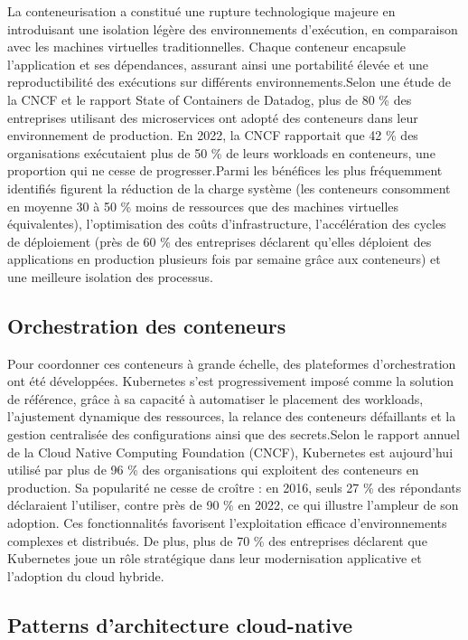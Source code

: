 La conteneurisation a constitué une rupture technologique majeure en introduisant une isolation légère des environnements d’exécution, en comparaison avec les machines virtuelles traditionnelles. Chaque conteneur encapsule l’application et ses dépendances, assurant ainsi une portabilité élevée et une reproductibilité des exécutions sur différents environnements.Selon une étude de la CNCF et le rapport State of Containers de Datadog, plus de 80 \% des entreprises utilisant des microservices ont adopté des conteneurs dans leur environnement de production. En 2022, la CNCF rapportait que 42 \% des organisations exécutaient plus de 50 \% de leurs workloads en conteneurs, une proportion qui ne cesse de progresser.Parmi les bénéfices les plus fréquemment identifiés figurent la réduction de la charge système (les conteneurs consomment en moyenne 30 à 50 \% moins de ressources que des machines virtuelles équivalentes), l’optimisation des coûts d’infrastructure, l’accélération des cycles de déploiement (près de 60 \% des entreprises déclarent qu’elles déploient des applications en production plusieurs fois par semaine grâce aux conteneurs) et une meilleure isolation des processus.

\subsection{Orchestration des conteneurs}

Pour coordonner ces conteneurs à grande échelle, des plateformes d’orchestration ont été développées. Kubernetes s’est progressivement imposé comme la solution de référence, grâce à sa capacité à automatiser le placement des workloads, l’ajustement dynamique des ressources, la relance des conteneurs défaillants et la gestion centralisée des configurations ainsi que des secrets.Selon le rapport annuel de la Cloud Native Computing Foundation (CNCF), Kubernetes est aujourd’hui utilisé par plus de 96 \% des organisations qui exploitent des conteneurs en production. Sa popularité ne cesse de croître : en 2016, seuls 27 \% des répondants déclaraient l’utiliser, contre près de 90 \% en 2022, ce qui illustre l’ampleur de son adoption. Ces fonctionnalités favorisent l’exploitation efficace d’environnements complexes et distribués. De plus, plus de 70 \% des entreprises déclarent que Kubernetes joue un rôle stratégique dans leur modernisation applicative et l’adoption du cloud hybride.

\subsection{Patterns d’architecture cloud-native}

